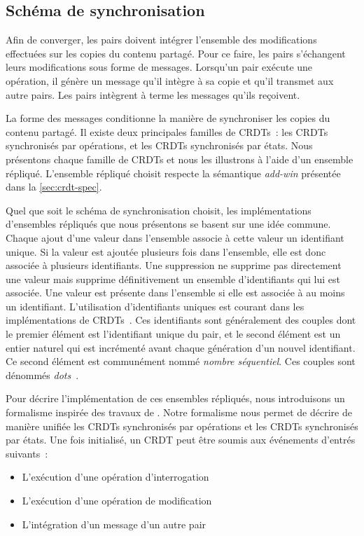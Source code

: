 \subsection{Schéma de synchronisation}\label{sec:crdt-sync}

Afin de converger, les pairs doivent intégrer l'ensemble des modifications effectuées sur les copies du contenu partagé.
Pour ce faire, les pairs s'échangent leurs modifications sous forme de messages.
Lorsqu'un pair exécute une opération, il génère un message qu'il intègre à sa copie et qu'il transmet aux autre pairs.
Les pairs intègrent à terme les messages qu'ils reçoivent.

La forme des messages conditionne la manière de synchroniser les copies du contenu partagé.
Il existe deux principales familles de \acp{CRDT}~: les \acp{CRDT} synchronisés par opérations, et les \acp{CRDT} synchronisés par états.
Nous présentons chaque famille de \acp{CRDT} et nous les illustrons à l'aide d'un ensemble répliqué.
L'ensemble répliqué choisit respecte la sémantique \emph{add-win} présentée dans la \autoref{sec:crdt-spec}.

Quel que soit le schéma de synchronisation choisit, les implémentations d'ensembles répliqués que nous présentons se basent sur une idée commune.
Chaque ajout d'une valeur dans l'ensemble associe à cette valeur un identifiant unique.
Si la valeur est ajoutée plusieurs fois dans l'ensemble, elle est donc associée à plusieurs identifiants.
Une suppression ne supprime pas directement une valeur mais supprime définitivement un ensemble d'identifiants qui lui est associée.
Une valeur est présente dans l'ensemble si elle est associée à au moins un identifiant.
L'utilisation d'identifiants uniques est courant dans les implémentations de \acp{CRDT}~\autocite{baquero_2018_pure-op-crdt,almeida_2018_delta-crdt-revisited}.
Ces identifiants sont généralement des couples dont le premier élément est l'identifiant unique du pair, et le second élément est un entier naturel qui est incrémenté avant chaque génération d'un nouvel identifiant.
Ce second élément est communément nommé \emph{nombre séquentiel}.
Ces couples sont dénommés \emph{dots}~\autocite{baquero_2018_pure-op-crdt}.

Pour décrire l'implémentation de ces ensembles répliqués, nous introduisons un formalisme inspirée des travaux de \textcite{baquero_2018_pure-op-crdt}.
Notre formalisme nous permet de décrire de manière unifiée les \acp{CRDT} synchronisés par opérations et les \acp{CRDT} synchronisés par états.
Une fois initialisé, un \ac{CRDT} peut être soumis aux événements d'entrés suivants~:
\begin{itemize}
\item L'exécution d'une opération d'interrogation
\item L'exécution d'une opération de modification
\item L'intégration d'un message d'un autre pair
\end{itemize}


